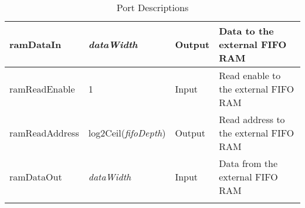 \begin{longtable}[H]{
  | p{}
  | p{}
  | p{}
  | p{} |
  }
  \rowcolor{fog-grey}
  ramDataIn &    
  \textit{dataWidth} & 
  Output &    
  Data to the external FIFO RAM \\ \hline
 
  \rowcolor{fog-grey}
  ramReadEnable &
  1 &      
  Input &        
  Read enable to the external FIFO RAM \\ \hline
 
  \rowcolor{fog-grey}
  ramReadAddress & 
  log2Ceil(\textit{fifoDepth}) & %
  Output &    
  Read address to the external FIFO RAM \\ \hline
 
  \rowcolor{fog-grey}
  ramDataOut &   
  \textit{dataWidth} & 
  Input &     
  Data from the external FIFO RAM \\ \hline
 
  \caption{Port Descriptions}\label{table:ports}
\end{longtable}
